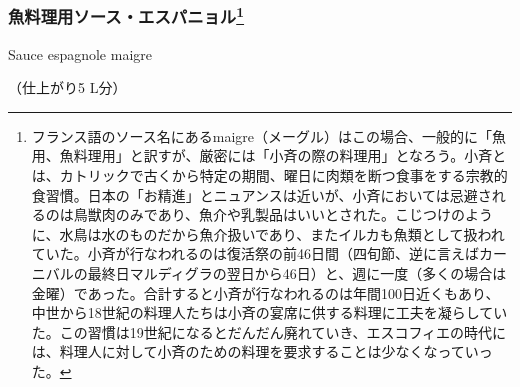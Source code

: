 \begin{recette}
\atoaki{}

\hypertarget{sauce-espagnole-maigre}{%
\subsubsection[魚料理用ソース・エスパニョル]{\texorpdfstring{魚料理用ソース・エスパニョル\footnote{フランス語のソース名にあるmaigre（メーグル）はこの場合、一般的に「魚用、魚料理用」と訳すが、厳密には「小斉の際の料理用」となろう。小斉とは、カトリックで古くから特定の期間、曜日に肉類を断つ食事をする宗教的食習慣。日本の「お精進」とニュアンスは近いが、小斉においては忌避されるのは鳥獣肉のみであり、魚介や乳製品はいいとされた。こじつけのように、水鳥は水のものだから魚介扱いであり、またイルカも魚類として扱われていた。小斉が行なわれるのは復活祭の前46日間（四旬節、逆に言えばカーニバルの最終日マルディグラの翌日から46日）と、週に一度（多くの場合は金曜）であった。合計すると小斉が行なわれるのは年間100日近くもあり、中世から18世紀の料理人たちは小斉の宴席に供する料理に工夫を凝らしていた。この習慣は19世紀になるとだんだん廃れていき、エスコフィエの時代には、料理人に対して小斉のための料理を要求することは少なくなっていった。}}{魚料理用ソース・エスパニョル}}\label{sauce-espagnole-maigre}}

\begin{frsubenv}

Sauce espagnole maigre

\end{frsubenv}


（仕上がり5 L分）


\end{recette}
